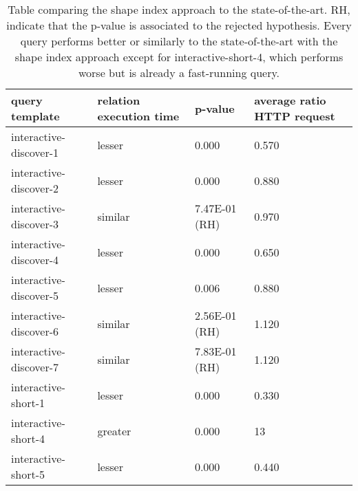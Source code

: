 \begin{table}
	\begin{center}
		\begin{tabular}{|l|l|l|l|}
			\hline
			query template & relation execution time & p-value & average ratio HTTP request \\
			\hline
			interactive-discover-1 & lesser & 0.000 & 0.570 \\
			\hline
			interactive-discover-2 & lesser & 0.000 & 0.880 \\
			\hline
			interactive-discover-3 & similar & 7.47E-01 (RH) & 0.970 \\
			\hline
			interactive-discover-4 & lesser & 0.000 & 0.650 \\
			\hline
			interactive-discover-5 & lesser & 0.006 & 0.880 \\
			\hline
			interactive-discover-6 & similar & 2.56E-01 (RH) & 1.120 \\
			\hline
			interactive-discover-7 & similar & 7.83E-01 (RH) & 1.120 \\
			\hline
			interactive-short-1 & lesser & 0.000 & 0.330 \\
			\hline
			interactive-short-4 & greater & 0.000 & 13 \\
			\hline
			interactive-short-5 & lesser & 0.000 & 0.440 \\
			\hline
		\end{tabular}
	\end{center}
	\caption{Table comparing the shape index approach to the state-of-the-art. RH, indicate that the p-value is associated to the rejected hypothesis. Every query performs better or similarly to the state-of-the-art with the shape index approach except for interactive-short-4, which performs worse but is already a fast-running query.}
	\label{tab:statSignificanceStateOfTheArt}
\end{table}